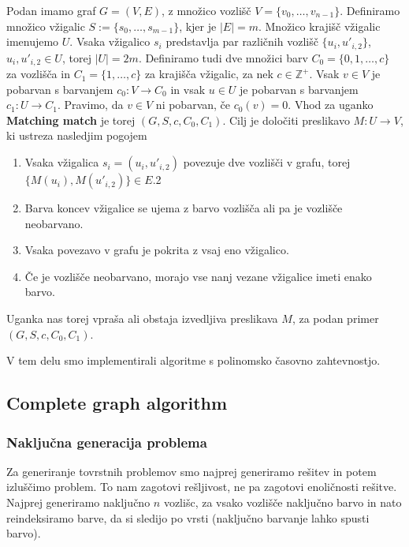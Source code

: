 Podan imamo graf $G = (V,E)$, z množico vozlišč $V=\{v_0,\ldots,v_{n-1}\}$. Definiramo množico vžigalic $S:=\{s_0,\ldots,s_{m-1}\}$, kjer je $|E| = m$. Množico krajišč vžigalic imenujemo $U$. Vsaka vžigalico $s_i$ predstavlja par različnih vozlišč $\{u_i,u'_{i,2}\}$, $u_i, u'_{i,2} \in U$, torej $|U| = 2m$. Definiramo tudi dve  množici barv $C_0 = \{0,1,\ldots,c \}$ za vozlišča in $C_1 = \{1, \ldots, c\}$ za krajišča vžigalic, za nek $c \in \mathbb{Z}^+$. Vsak $v\in V$ je pobarvan s barvanjem $c_0 : V \rightarrow C_0$ in vsak $u \in U$ je pobarvan s barvanjem $c_1: U \rightarrow C_1 $. Pravimo, da $v\in V$ ni pobarvan, če $c_0(v)=0$. Vhod za uganko \textbf{Matching match} je torej $(G,S,c,C_0,C_1)$. Cilj je določiti preslikavo $M: U \rightarrow V$, ki ustreza nasledjim pogojem
\begin{enumerate}
    \item Vsaka vžigalica $s_i = (u_i,u'_{i,2})$ povezuje dve vozlišči v grafu, torej $\{M(u_i),M(u'_{i,2})\} \in E$.2
    \item Barva koncev vžigalice se ujema z barvo vozlišča ali pa je vozlišče neobarvano.
    \item Vsaka povezavo v grafu je pokrita z vsaj eno vžigalico.
    \item Če je vozlišče neobarvano, morajo vse nanj vezane vžigalice imeti enako barvo.
\end{enumerate}
Uganka nas torej vpraša ali obstaja izvedljiva preslikava $M$, za podan primer $(G,S,c,C_0,C_1)$. 

V tem delu smo implementirali algoritme s polinomsko časovno zahtevnostjo.
\subsection{Complete graph algorithm}
\subsubsection{Naključna generacija problema}
Za generiranje tovrstnih problemov smo najprej generiramo rešitev in potem izluščimo problem.
To nam zagotovi rešljivost, ne pa zagotovi enoličnosti rešitve. Najprej generiramo naključno $n$ vozlišc, za vsako vozlišče naključno barvo in nato reindeksiramo barve, da si sledijo po vrsti (naključno barvanje lahko spusti barvo).


